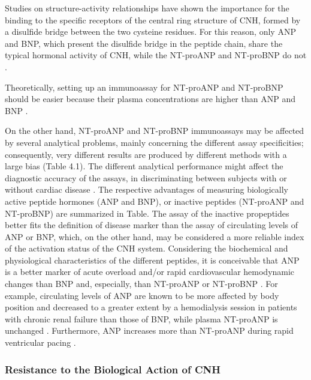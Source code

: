 \documentclass[14pt,a4paper,onecolumn]{extarticle}
\begin{document}
Studies on structure-activity relationships have shown the importance for the binding to the specific receptors of the central ring structure of CNH, formed by a disulfide bridge between the two cysteine residues. For this reason, only ANP and BNP, which
present the disulfide bridge in the peptide chain, share the typical hormonal activity of
CNH, while the NT-proANP and NT-proBNP do not \citep{bib31} \citep{bib32} \citep{bib33} \citep{bib34} \citep{bib35} \citep{bib36} \citep{bib37}.

Theoretically, setting up an immunoassay for NT-proANP and NT-proBNP should
be easier because their plasma concentrations are higher than ANP and BNP \citep{bib318}.

On the other hand, NT-proANP and NT-proBNP immunoassays may be affected by several analytical problems, mainly concerning the different assay specificities; consequently, very different results are produced by different methods with a large bias \citep{bib32} \citep{bib35} \citep{bib36} \citep{bib318} (Table 4.1). The different analytical performance might affect the diagnostic
accuracy of the assays, in discriminating between subjects with or without cardiac
disease \citep{bib32} \citep{bib35} \citep{bib36} .
The respective advantages of measuring biologically active peptide hormones (ANP
and BNP), or inactive peptides (NT-proANP and NT-proBNP) are summarized in Table. The assay of the inactive propeptides better fits the definition of disease marker than the assay of circulating levels of ANP or BNP, which, on the other hand, may be considered a more reliable index of the activation status of the CNH system.
Considering the biochemical and physiological characteristics of the different peptides, it is conceivable that ANP is a better marker of acute overload and/or rapid cardiovascular hemodynamic changes than BNP and, especially, than NT-proANP or
NT-proBNP \citep{bib32} \citep{bib35}. For example, circulating levels of ANP are known to be more affected by body position and decreased to a greater extent by a hemodialysis session in
patients with chronic renal failure than those of BNP, while plasma NT-proANP is
unchanged \citep{bib322}. Furthermore, ANP increases more than NT-proANP during rapid
ventricular pacing \citep{bib323}.


\subsubsection{ Resistance to the Biological Action of CNH}
\end{document}
